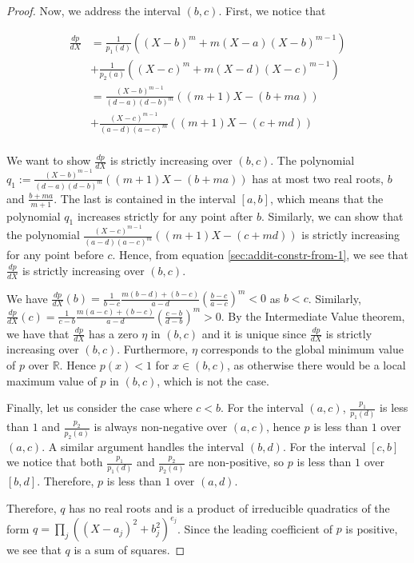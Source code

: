 \documentclass[10pt,a4paper]{amsart}
\begin{document}
\begin{proof}
  Now, we address the interval $(b, c)$. First, we notice that
  \vspace{-5mm}

  \begin{equation}
    \label{sec:addit-constr-from-1}
    \begin{split}
      \frac{dp}{dX}
      &= \frac{1}{p_1(d)}((X-b)^{m} + m (X-a)(X-b)^{m-1})\\
      &+
        \frac{1}{p_2(a)}((X-c)^{m} + m (X-d)(X-c)^{m-1})\\
      &= \frac{(X - b)^{m-1}}{(d-a)(d-b)^{m}}((m+1)X - (b + m a))\\
      &+
        \frac{(X-c)^{m-1}}{(a-d)(a-c)^{m}}((m+1)X - (c + m d))\\
    \end{split}
  \end{equation}

  We want to show $\frac{dp}{dX}$ is strictly increasing over $(b, c)$.  The
  polynomial $q_1 := \frac{(X - b)^{m-1}}{(d-a)(d-b)^{m}}((m+1)X - (b + m a))$
  has at most two real roots, $b$ and $\frac{b + ma}{m+1}$. The last is
 contained in the interval $[a, b]$, which means that the polynomial $q_1$ increases
 strictly for any point after $b$. Similarly, we can show that the
  polynomial $\frac{(X-c)^{m-1}}{(a-d)(a-c)^{m}}((m+1)X - (c + m d))$ is
  strictly increasing for any point before $c$. Hence, from equation
  \eqref{sec:addit-constr-from-1}, we see that $\frac{dp}{dX}$ is strictly
  increasing over $(b, c)$.

  We have
  $\frac{dp}{dX}(b) = \frac{1}{b-c} \frac{m(b-d) + (b - c)}{a-d}
  (\frac{b-c}{a-c})^{m} < 0$ as $b < c$. Similarly,
  $\frac{dp}{dX}(c) = \frac{1}{c-b} \frac{m(a-c) + (b - c)}{a-d}
  (\frac{c-b}{d-b})^{m} > 0$. By the Intermediate Value theorem, we have that
  $\frac{dp}{dX}$ has a zero $\eta$ in $(b, c)$ and it is unique since
  $\frac{dp}{dX}$ is strictly increasing over $(b, c)$. Furthermore, $\eta$
  corresponds to the global minimum value of $p$ over $\mathbb{R}$. Hence
  $p(x) < 1$ for $x \in (b, c)$, as otherwise there would be a local maximum
  value of $p$ in $(b, c)$, which is not the case.

  Finally, let us consider the case where $c < b$. For the interval $(a, c)$,
  $\frac{p_1}{p_1(d)}$ is less than $1$ and $\frac{p_2}{p_2(a)}$
  is always non-negative over $(a, c)$, hence $p$ is less than $1$ over $(a,
  c)$. A similar argument handles the interval $(b, d)$. For the interval $[c,
  b]$ we notice that both $\frac{p_1}{p_1(d)}$ and $\frac{p_2}{p_2(a)}$ are
  non-positive, so $p$ is less than $1$ over $[b, d]$. Therefore, $p$ is less
  than $1$ over $(a, d)$.

  Therefore, $q$ has no real roots and is a product of irreducible quadratics
  of the form $q = \prod_{j}^{}{((X - a_j)^2 + b_j^2)^{e_j}}$. Since the leading
  coefficient of $p$ is positive, we see that $q$ is a sum of squares.
\end{proof}
\end{document}
